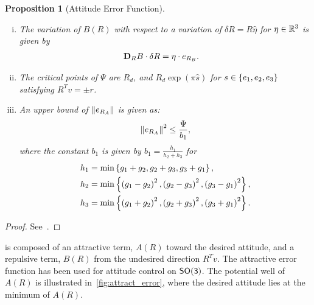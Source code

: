\documentclass[letterpaper, 10 pt, conference]{ieeeconf}  %
\newtheorem{prop}{Proposition}
\begin{document}
\begin{prop}[Attitude Error Function]
\begin{enumerate}[(i)]
	\begin{align}
		\dirDiff{A}{R} &= \eta \cdot e_{R_A} .
	\end{align}
	\item \label{item:prop_erb} The variation of \( B(R) \) with respect to a variation of \( \delta R = R \hat{\eta} \) for \( \eta \in \mathbb{R}^3 \) is given by
	\begin{align}
		\mathbf{D}_{R} B \cdot \delta R &= \eta \cdot e_{R_{B}} .
	\end{align}
	\item \label{item:prop_crit}The critical points of \( \Psi \) are $R_d$, and $R_d \exp(\pi \hat{s})$ for $s \in \left\{ e_1, e_2, e_3 \right\}$ satisfying $R^T v = \pm r$.
	\item \label{item:prop_era_upbound}An upper bound of \( \left\| e_{R_A} \right\| \) is given as:
	\begin{align}
		\left\| e_{R_A} \right\|^2 \leq \frac{\Psi}{b_1} , \label{eqn:psi_lower_bound}
	\end{align}
	where the constant \( b_1 \) is given by \( b_1 = \frac{h_1}{h_2 + h_3} \) for 
	\begin{align*}
		h_1 &= \min\left\{ g_1 + g_2, g_2 + g_3 , g_3 + g_1 \right\} ,\\
		h_2 &= \min\left\{ \left( g_1 -g_2 \right)^2,\left( g_2 -g_3 \right)^2 , \left( g_3 -g_1 \right)^2 \right\} ,\\
		h_3 &= \min\left\{ \left( g_1 + g_2 \right)^2, \left( g_2 + g_3 \right)^2 , \left( g_3 + g_1 \right)^2 \right\}.		
	\end{align*}
\end{enumerate}
\end{prop}
\begin{proof}
See~.
\end{proof}

 is composed of an attractive term, \( A (R) \) toward the desired attitude, and a repulsive term, \( B(R) \) from the undesired direction \( R^T v \).
The attractive error function has been used for attitude control on \(\mathsf{SO(3)}\).
The potential well of \( A(R)\) is illustrated in~\cref{fig:attract_error}, where the desired attitude lies at the minimum of \( A(R) \).
\end{document}
